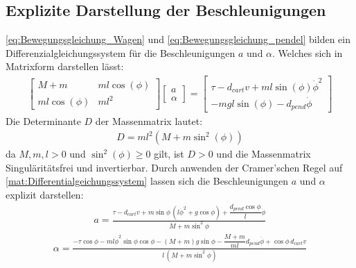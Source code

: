 \subsection{Explizite Darstellung der Beschleunigungen}
\eqref{eq:Bewegungsgleichung_Wagen} und \eqref{eq:Bewegungsgleichung_pendel} bilden ein Differenzialgleichungssystem für die Beschleunigungen $a$ und $\alpha$.
Welches sich in Matrixform darstellen lässt:
\begin{align}
    \begin{bmatrix}
        M+m & m l \cos(\phi) \\
        m l \cos(\phi) & m l^2
    \end{bmatrix}
    \begin{bmatrix}
        a \\
        \alpha
    \end{bmatrix}
    =
    \begin{bmatrix}
        \tau - d_{cart} v + m l \sin(\phi) \dot{\phi}^2 \\
        - m g l \sin(\phi) - d_{pend} \dot{\phi}
    \end{bmatrix}
    \label{mat:Differentialgeichungssystem}
\end{align}
Die Determinante $D$ der Massenmatrix lautet:
\begin{align}
    D = m l^2 (M + m \sin^2(\phi))
\end{align}
da $M, m , l > 0 $ und $\sin^2(\phi) \geq 0$ gilt, ist $D > 0$ und die Massenmatrix Singuläritätsfrei und invertierbar.
Durch anwenden der Cramer'schen Regel auf \eqref{mat:Differentialgeichungssystem} lassen sich die Beschleunigungen $a$ und $\alpha$ explizit darstellen:
\begin{align}
    a = \frac{\tau - d_{cart}v + m\sin\phi\,(l\dot\phi^2 + g\cos\phi)
      + \dfrac{d_{pend}\cos\phi}{l}\dot\phi}{M + m\sin^2\phi}
    \label{eq:Beschleunigung_Wagen}
\end{align}
\begin{align}
    \alpha = \frac{-\tau\cos\phi - ml\dot\phi^2\sin\phi\cos\phi
      - (M+m)g\sin\phi - \dfrac{M+m}{ml}d_{pend}\dot\phi
      + \cos\phi\,d_{cart}v}{l\,(M + m\sin^2\phi)}
    \label{eq:Beschleunigung_Pendel}
\end{align}
